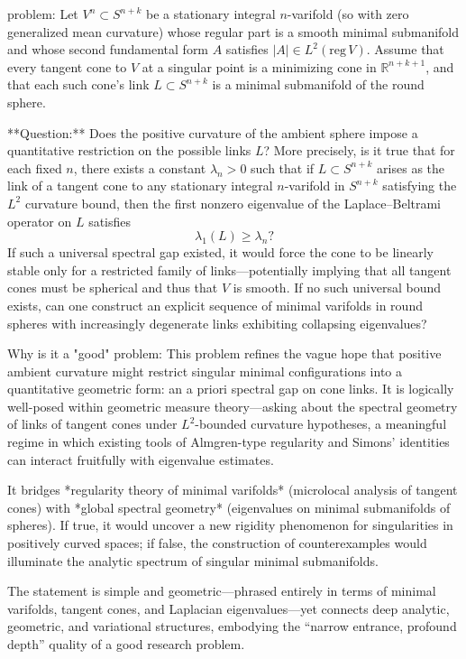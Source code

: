 problem:  
Let \( V^n \subset S^{n+k} \) be a stationary integral \( n \)-varifold (so with zero generalized mean curvature) whose regular part is a smooth minimal submanifold and whose second fundamental form \( A \) satisfies \( |A| \in L^2(\mathrm{reg}\, V) \).  
Assume that every tangent cone to \( V \) at a singular point is a minimizing cone in \( \mathbb{R}^{n+k+1} \), and that each such cone’s link \( L \subset S^{n+k} \) is a minimal submanifold of the round sphere.  

**Question:**  
Does the positive curvature of the ambient sphere impose a quantitative restriction on the possible links \( L \)?  
More precisely, is it true that for each fixed \( n \), there exists a constant \( \lambda_n > 0 \) such that if \( L \subset S^{n+k} \) arises as the link of a tangent cone to any stationary integral \( n \)-varifold in \( S^{n+k} \) satisfying the \( L^2 \) curvature bound, then the first nonzero eigenvalue of the Laplace–Beltrami operator on \( L \) satisfies  
\[
\lambda_1(L) \ge \lambda_n?
\]  
If such a universal spectral gap existed, it would force the cone to be linearly stable only for a restricted family of links—potentially implying that all tangent cones must be spherical and thus that \(V\) is smooth.  
If no such universal bound exists, can one construct an explicit sequence of minimal varifolds in round spheres with increasingly degenerate links exhibiting collapsing eigenvalues?

Why is it a "good" problem:  
This problem refines the vague hope that positive ambient curvature might restrict singular minimal configurations into a quantitative geometric form: an a priori spectral gap on cone links. It is logically well-posed within geometric measure theory—asking about the spectral geometry of links of tangent cones under \(L^2\)-bounded curvature hypotheses, a meaningful regime in which existing tools of Almgren-type regularity and Simons’ identities can interact fruitfully with eigenvalue estimates.  

It bridges *regularity theory of minimal varifolds* (microlocal analysis of tangent cones) with *global spectral geometry* (eigenvalues on minimal submanifolds of spheres).  
If true, it would uncover a new rigidity phenomenon for singularities in positively curved spaces; if false, the construction of counterexamples would illuminate the analytic spectrum of singular minimal submanifolds.  

The statement is simple and geometric—phrased entirely in terms of minimal varifolds, tangent cones, and Laplacian eigenvalues—yet connects deep analytic, geometric, and variational structures, embodying the “narrow entrance, profound depth” quality of a good research problem.